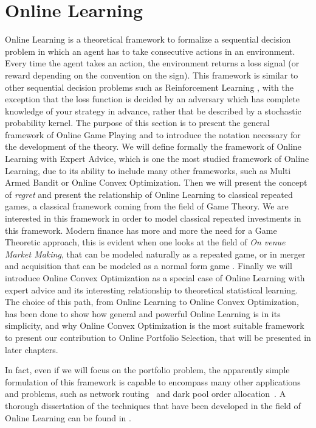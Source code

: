 \chapter{Online Learning}\label{ch:OnlineLearning}
Online Learning is a theoretical framework to formalize a sequential decision problem in which an agent has to take consecutive actions in an environment. Every time the agent takes an action, the environment returns a loss signal (or reward depending on the convention on the sign). This framework is similar to other sequential decision problems such as Reinforcement Learning \cite{sutton1998introduction}, with the exception that the loss function is decided by an adversary which has complete knowledge of your strategy in advance, rather that be described by a stochastic probability kernel. 
The purpose of this section is to present the general framework of Online Game Playing and to introduce the notation necessary for the development of the theory. We will define formally the framework of Online Learning with Expert Advice, which is one the most studied framework of Online Learning, due to its ability to include many other frameworks, such as Multi Armed Bandit or Online Convex Optimization.
Then we will present the concept of \emph{regret} and present the relationship of Online Learning to classical repeated games, a classical framework coming from the field of Game Theory. 
We are interested in this framework in order to model classical repeated investments in this framework. 
Modern finance  has more and more the need for a Game Theoretic approach, this is evident when one looks at the field of \emph{On venue Market Making}, that can be modeled naturally as a repeated game, or in merger and acquisition that can be modeled as a normal form game \cite{Yanqing_MaA}. 
Finally we will introduce Online Convex Optimization as a special case of Online Learning with expert advice and its interesting relationship to theoretical statistical learning. The choice of this path, from Online Learning to Online Convex Optimization, has been done to show how general and powerful Online Learning is in its simplicity, and why Online Convex Optimization is the most suitable framework to present our contribution to Online Portfolio Selection, that will be presented in later chapters.

In fact, even if we will focus on the portfolio problem, the apparently simple formulation of this framework is capable to encompass many other applications and problems, such as network routing~\cite{belmega2018online} and dark pool order allocation~\cite{agarwal2010optimal}. 
A thorough dissertation of the techniques that have been developed in the field of Online Learning can be found in \cite{cesa2006prediction}.

